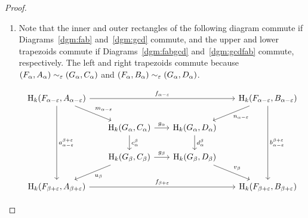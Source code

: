 \begin{proof}
  \begin{enumerate}[label=\Roman*.]
    \item Note that the inner and outer rectangles of the following diagram commute if Diagrams~\ref{dgm:fab} and~\ref{dgm:gcd} commute, and the upper and lower trapezoids commute if Diagrams~\ref{dgm:fabgcd} and~\ref{dgm:gcdfab} commute, respectively.
    The left and right trapezoids commute because $(F_\alpha, A_\alpha)\sim_\varepsilon (G_\alpha, C_\alpha)$ and $(F_\alpha, B_\alpha)\sim_\varepsilon (G_\alpha, D_\alpha)$.

    \begin{equation}\label{dgm:intr1a}\begin{tikzcd}[column sep=scriptsize]
      \hom_k(F_{\alpha-\e}, A_{\alpha-\e})  \arrow[to=Ba, "f_{\alpha-\e}"]
                                            \arrow[to=Ca, "m_{\alpha-\e}"]
                                            \arrow[to=Ab, "a_{\alpha-\e}^{\beta +\e}"]
      & & & |[alias=Ba]|
        \hom_k(F_{\alpha - \e}, B_{\alpha-\e})  \arrow[to=Da, "n_{\alpha -\e}"]
                                                \arrow[to=Bb, "b_{\alpha-\e}^{\beta+\e}"] \\
      & |[alias=Ca]|
      \hom_k(G_\alpha, C_\alpha)  \arrow[to=Da, "g_\alpha"]
                                  \arrow[to=Cb, "c_\alpha^\beta"]
      & |[alias=Da]|
        \hom_k(G_\alpha, D_\alpha)  \arrow[to=Db, "d_\alpha^\beta"] & \\
      & |[alias=Cb]|
      \hom_k(G_\beta, C_\beta)  \arrow[to=Ab, "u_\beta"]
                                \arrow[to=Db, "g_\beta"]
      & |[alias=Db]|
        \hom_k(G_\beta, D_\beta)  \arrow[to=Bb, "v_\beta"] & \\
      |[alias=Ab]|
      \hom_k(F_{\beta +\e}, A_{\beta + \e}) \arrow[to=Bb, "f_{\beta+\e}"]
      & & & |[alias=Bb]|
        \hom_k(F_{\beta+\e}, B_{\beta + \e})
    \end{tikzcd}\end{equation}


\end{enumerate}
\end{proof}
